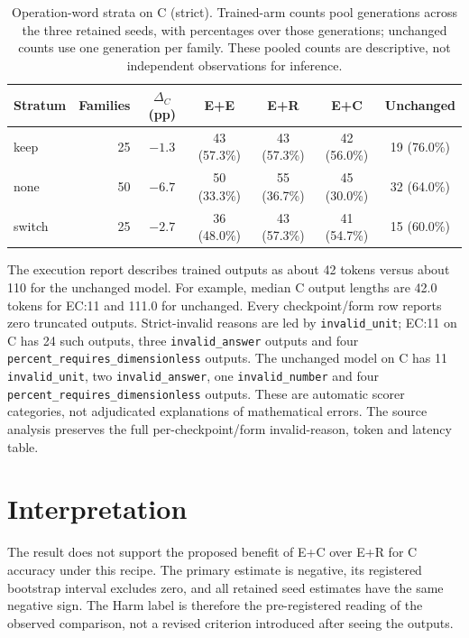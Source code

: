 \begin{table}[H]
\centering\footnotesize\singlespacing
\caption{Operation-word strata on C (strict). Trained-arm counts pool generations across the three retained seeds, with percentages over those generations; unchanged counts use one generation per family. These pooled counts are descriptive, not independent observations for inference.}
\label{tab:phase2-strata}
\begin{tabular}{@{}lrccccc@{}}
\toprule
Stratum & Families & $\Delta_C$ (pp) & E+E & E+R & E+C & Unchanged\\
\midrule
keep & 25 & $-1.3$ & 43 (57.3\%) & 43 (57.3\%) & 42 (56.0\%) & 19 (76.0\%)\\
none & 50 & $-6.7$ & 50 (33.3\%) & 55 (36.7\%) & 45 (30.0\%) & 32 (64.0\%)\\
switch & 25 & $-2.7$ & 36 (48.0\%) & 43 (57.3\%) & 41 (54.7\%) & 15 (60.0\%)\\
\bottomrule
\end{tabular}
\end{table}


The execution report describes trained outputs as about 42 tokens versus about 110 for the unchanged model. For example, median C output lengths are 42.0 tokens for EC:11 and 111.0 for unchanged. Every checkpoint/form row reports zero truncated outputs. Strict-invalid reasons are led by \texttt{invalid\_unit}; EC:11 on C has 24 such outputs, three \texttt{invalid\_answer} outputs and four \texttt{percent\_requires\_dimensionless} outputs. The unchanged model on C has 11 \texttt{invalid\_unit}, two \texttt{invalid\_answer}, one \texttt{invalid\_number} and four \texttt{percent\_requires\_dimensionless} outputs. These are automatic scorer categories, not adjudicated explanations of mathematical errors. The source analysis preserves the full per-checkpoint/form invalid-reason, token and latency table.

\section{Interpretation}
\label{sec:phase2-interpretation}
The result does not support the proposed benefit of E+C over E+R for C accuracy under this recipe. The primary estimate is negative, its registered bootstrap interval excludes zero, and all retained seed estimates have the same negative sign. The Harm label is therefore the pre-registered reading of the observed comparison, not a revised criterion introduced after seeing the outputs.

